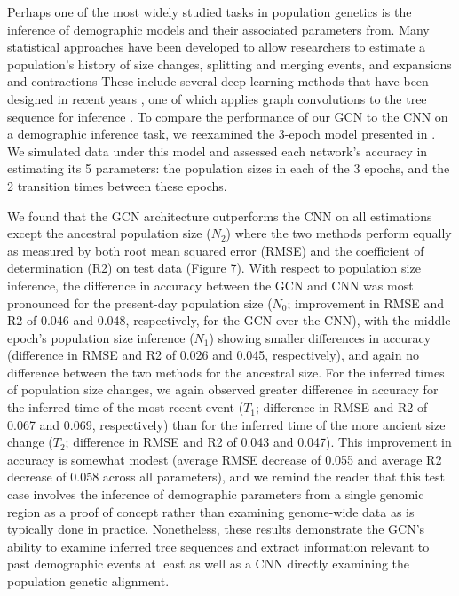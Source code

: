 Perhaps one of the most widely studied tasks in population genetics is the inference of demographic models and their associated parameters from. Many statistical approaches have been developed to allow researchers to estimate a population's history of size changes, splitting and merging events, and expansions and contractions \cite{browningAccurateNonparametricEstimation2015,excoffierFastsimcoal2DemographicInference2021,gutenkunstInferringJointDemographic2009,gutenkunstInferringJointDemographic2009,gutenkunstDiffusionApproximationsDemographic2010,kammEfficientlyInferringDemographic2020,liInferenceHumanPopulation2011,santiagoRecentDemographicHistory2020,terhorstRobustScalableInference2017} These include several deep learning methods that have been designed in recent years \cite{sanchezDeepLearningPopulation2021,wangAutomaticInferenceDemographic2021}, one of which applies graph convolutions to the tree sequence for inference \cite{korfmannSimultaneousInferenceDemography2023}. To compare the performance of our GCN to the CNN on a demographic inference task, we reexamined the 3-epoch model presented in \cite{flagelUnreasonableEffectivenessConvolutional2019}. We simulated data under this model and assessed each network's accuracy in estimating its 5 parameters: the population sizes in each of the 3 epochs, and the 2 transition times between these epochs. 

We found that the GCN architecture outperforms the CNN on all estimations except the ancestral population size ($N_2$) where the two methods perform equally as measured by both root mean squared error (RMSE) and the coefficient of determination (R2) on test data (Figure 7). With respect to population size inference, the difference in accuracy between the GCN and CNN was most pronounced for the present-day population size ($N_0$; improvement in RMSE and R2 of 0.046 and 0.048, respectively, for the GCN over the CNN), with the middle epoch's population size inference ($N_1$) showing smaller differences in accuracy (difference in RMSE and R2 of 0.026 and 0.045, respectively), and again no difference between the two methods for the ancestral size. For the inferred times of population size changes, we again observed greater difference in accuracy for the inferred time of the most recent event ($T_1$; difference in RMSE and R2 of 0.067 and 0.069, respectively) than for the inferred time of the more ancient size change ($T_2$; difference in RMSE and R2 of 0.043 and 0.047). This improvement in accuracy is somewhat modest (average RMSE decrease of 0.055 and average R2 decrease of 0.058 across all parameters), and we remind the reader that this test case involves the inference of demographic parameters from a single genomic region as a proof of concept rather than examining genome-wide data as is typically done in practice. Nonetheless, these results demonstrate the GCN's ability to examine inferred tree sequences and extract information relevant to past demographic events at least as well as a CNN directly examining the population genetic alignment. 

